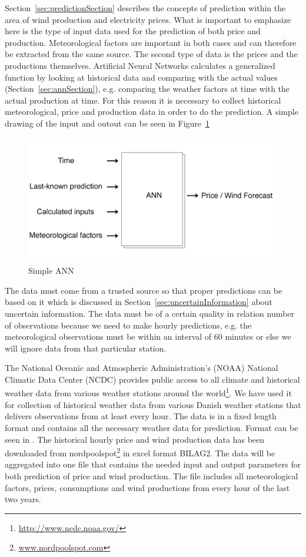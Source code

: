 Section~\ref{sec:predictionSection} describes the concepts of prediction within the area of wind production and electricity prices. What is important to emphasize here is the type of input data used for the prediction of both price and production. Meteorological factors are important in both cases and can therefore be extracted from the same source. The second type of data is the prices and the productions themselves. Artificial Neural Networks calculates a generalized function by looking at historical data and comparing with the actual values (Section~\ref{sec:annSection}), e.g. comparing the weather factors at time with the actual production at time. For this reason it is necessary to collect historical meteorological, price and production data in order to do the prediction. A simple drawing of the input and outout can be seen in Figure~\ref{fig:verySimpleANN}

\begin{figure}[H]
\centering
\includegraphics[width=0.85\linewidth,natwidth=898,natheight=587]{billeder/simpleANN.png}
\caption{Simple ANN}
\label{fig:verySimpleANN}
\end{figure}

The data must come from a trusted source so that proper predictions can be based on it which is discussed in Section~\ref{sec:uncertainInformation} about uncertain information. The data must be of a certain quality in relation number of observations because we need to make hourly predictions, e.g. the meteorological observations must be within an interval of 60 minutes or else we will ignore data from that particular station.

The National Oceanic and Atmospheric Administration's (NOAA) National Climatic Data Center (NCDC) provides public access to all climate and historical weather data from various weather stations around the world\footnote{\url{http://www.ncdc.noaa.gov/}}. We have used it for collection of historical weather data from various Danish weather stations that delivers observations from at least every hour. The data is in a fixed length format and contains all the necessary weather data for prediction. Format can be seen in . 
The historical hourly price and wind production data has been downloaded from nordpoolspot\footnote{\url{www.nordpoolspot.com}} in excel format BILAG2.
The data will be aggregated into one file that contains the needed input and output parameters for both prediction of price and wind production. The file includes all meteorological factors, prices, consumptions and wind productions from every hour of the last two years. 

